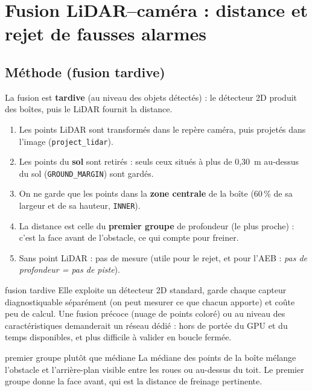 \documentclass[11pt,a4paper]{article}
\newcommand{\code}[1]{\texttt{#1}}
\begin{document}
\section{Fusion LiDAR--cam\'era : distance et rejet de fausses alarmes}
\subsection{M\'ethode (fusion tardive)}
La fusion est \textbf{tardive} (au niveau des objets d\'etect\'es) : le d\'etecteur 2D produit des bo\^ites, puis le LiDAR fournit la distance.
\begin{enumerate}
\item Les points LiDAR sont transform\'es dans le rep\`ere cam\'era, puis projet\'es dans l'image (\code{project\_lidar}).
\item Les points du \textbf{sol} sont retir\'es : seuls ceux situ\'es \`a plus de 0,30~m au-dessus du sol (\code{GROUND\_MARGIN}) sont gard\'es.
\item On ne garde que les points dans la \textbf{zone centrale} de la bo\^ite (60\,\% de sa largeur et de sa hauteur, \code{INNER}).
\item La distance est celle du \textbf{premier groupe} de profondeur (le plus proche) : c'est la face avant de l'obstacle, ce qui compte pour freiner.
\item Sans point LiDAR : pas de mesure (utile pour le rejet, et pour l'AEB : \emph{pas de profondeur = pas de piste}).
\end{enumerate}
\begin{choix}{fusion tardive}
Elle exploite un d\'etecteur 2D standard, garde chaque capteur diagnostiquable s\'epar\'ement (on peut mesurer ce que chacun apporte) et co\^ute
peu de calcul. Une fusion pr\'ecoce (nuage de points color\'e) ou au niveau des caract\'eristiques demanderait un r\'eseau d\'edi\'e : hors de port\'ee du GPU
et du temps disponibles, et plus difficile \`a valider en boucle ferm\'ee.
\end{choix}
\begin{choix}{premier groupe plut\^ot que m\'ediane}
La m\'ediane des points de la bo\^ite m\'elange l'obstacle et l'arri\`ere-plan visible entre les roues ou au-dessus du toit. Le premier groupe
donne la face avant, qui est la distance de freinage pertinente.
\end{choix}
\end{document}
